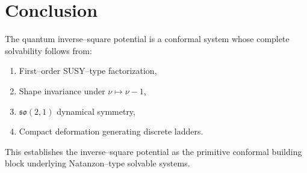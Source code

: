 \documentclass[11pt,a4paper]{article}
\begin{document}
\section{Conclusion}

The quantum inverse–square potential is a conformal system
whose complete solvability follows from:

\begin{enumerate}
\item First–order SUSY–type factorization,
\item Shape invariance under $\nu \mapsto \nu-1$,
\item $\mathfrak{so}(2,1)$ dynamical symmetry,
\item Compact deformation generating discrete ladders.
\end{enumerate}

This establishes the inverse–square potential as the
primitive conformal building block underlying
Natanzon–type solvable systems.
\end{document}
